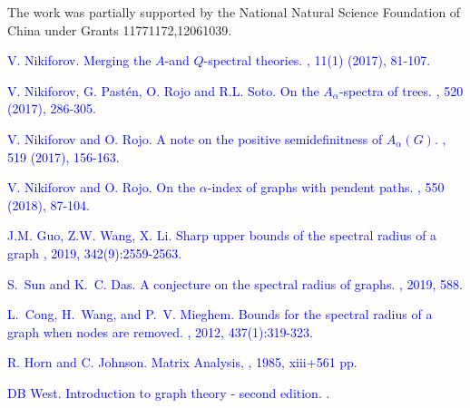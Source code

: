 \documentclass[amsthm]{elsart}
\begin{document}
\vskip4mm


 The work was partially supported by the National Natural Science Foundation of China under Grants 11771172,12061039.




\begin{thebibliography}{99}

\textcolor{blue}{
V. Nikiforov.
\newblock Merging the $A$-and $Q$-spectral theories.
, 11(1) (2017), 81-107.}

\textcolor{blue}{
V. Nikiforov, G. Past\'{e}n, O. Rojo and R.L. Soto.
\newblock On the $A_\alpha$-spectra of trees.
, 520 (2017), 286-305.}

\textcolor{blue}{
V. Nikiforov and O. Rojo.
\newblock A note on the positive semidefinitness of $A_\alpha(G)$.
, 519 (2017), 156-163.}

\textcolor{blue}{
V. Nikiforov and O. Rojo.
\newblock On the $\alpha$-index of graphs with pendent paths.
, 550 (2018), 87-104.}

\textcolor{blue}{
J.M. Guo, Z.W. Wang, X. Li.
\newblock Sharp upper bounds of the spectral radius of a graph
, 2019, 342(9):2559-2563.}

\textcolor{blue}{
S.~Sun and K.~C. Das.
\newblock A conjecture on the spectral radius of graphs.
, 2019, 588.}

\textcolor{blue}{
L.~Cong, H.~Wang, and P.~V. Mieghem.
\newblock Bounds for the spectral radius of a graph when nodes are removed.
, 2012, 437(1):319-323.}


\textcolor{blue}{
R. Horn and C. Johnson.
\newblock Matrix Analysis,
, 1985, xiii+561 pp.}

\textcolor{blue}{
DB West.
\newblock Introduction to graph theory - second edition.
.}










\end{thebibliography}
\end{document}
